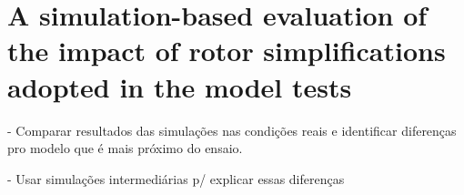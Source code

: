 \section{A simulation-based evaluation of the impact of rotor simplifications adopted in the model tests} \label{sec:impact_simplifications}
- Comparar resultados das simulações nas condições reais e identificar diferenças pro modelo que é mais próximo do ensaio.

- Usar simulações intermediárias p/ explicar essas diferenças

%
